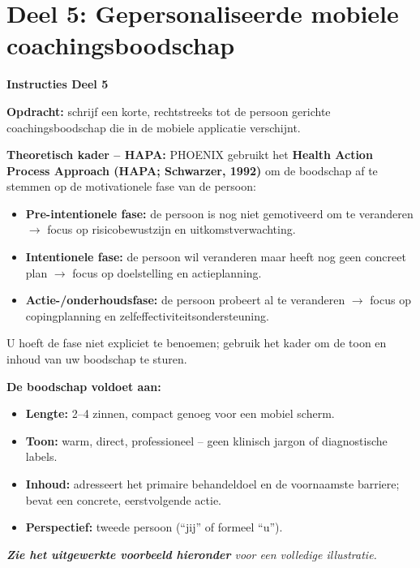 \documentclass[11pt,a4paper]{article}
\begin{document}
\vspace{0.6em}
\newpage


\section{Deel 5: Gepersonaliseerde mobiele coachingsboodschap}

\begin{tcolorbox}[colback=red!3,colframe=ForestGreen,arc=2.5mm,boxrule=0.9pt,
  left=10pt,right=10pt,top=9pt,bottom=9pt]
\textbf{\color{ForestGreen}Instructies Deel 5}

\smallskip\small
\textbf{Opdracht:} schrijf een korte, rechtstreeks tot de persoon gerichte
coachingsboodschap die in de mobiele applicatie verschijnt.

\textbf{Theoretisch kader -- HAPA:}
PHOENIX gebruikt het \textbf{Health Action Process Approach (HAPA; Schwarzer, 1992)}
om de boodschap af te stemmen op de motivationele fase van de persoon:
\begin{itemize}[topsep=2pt,itemsep=1pt]
\item \textbf{Pre-intentionele fase:} de persoon is nog niet gemotiveerd om te veranderen
$\rightarrow$ focus op risicobewustzijn en uitkomstverwachting.
\item \textbf{Intentionele fase:} de persoon wil veranderen maar heeft nog geen concreet plan
$\rightarrow$ focus op doelstelling en actieplanning.
\item \textbf{Actie-/onderhoudsfase:} de persoon probeert al te veranderen
$\rightarrow$ focus op copingplanning en zelfeffectiviteitsondersteuning.
\end{itemize}
U hoeft de fase niet expliciet te benoemen; gebruik het kader om de toon en inhoud
van uw boodschap te sturen.

\textbf{De boodschap voldoet aan:}
\begin{itemize}[topsep=2pt,itemsep=2pt]
\item \textbf{Lengte:} 2--4 zinnen, compact genoeg voor een mobiel scherm.
\item \textbf{Toon:} warm, direct, professioneel -- geen klinisch jargon of diagnostische labels.
\item \textbf{Inhoud:} adresseert het primaire behandeldoel en de voornaamste barriere;
bevat een concrete, eerstvolgende actie.
\item \textbf{Perspectief:} tweede persoon (``jij'' of formeel ``u'').
\end{itemize}

\medskip
\textit{\textbf{Zie het uitgewerkte voorbeeld hieronder} voor een volledige illustratie.}
\end{tcolorbox}
\end{document}
